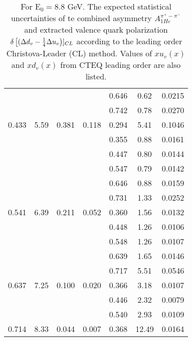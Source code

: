 \begin{table}[htbp]
\begin{center}
\begin{tabular}{|ccccc||c|c|}
         &          &          &          &    0.646 &      0.62 &    0.0215 \\
         &          &          &          &    0.742 &      0.78 &    0.0270 \\
   0.433 &    5.59 &   0.381 &    0.118 &    0.294 &      5.41 &    0.1046 \\
         &          &          &          &    0.355 &      0.88 &    0.0161 \\
         &          &          &          &    0.447 &      0.80 &    0.0144 \\
         &          &          &          &    0.547 &      0.79 &    0.0142 \\
         &          &          &          &    0.646 &      0.88 &    0.0159 \\
         &          &          &          &    0.731 &      1.33 &    0.0252 \\
   0.541 &    6.39 &   0.211 &    0.052 &    0.360 &      1.56 &    0.0132 \\
         &          &          &          &    0.448 &      1.26 &    0.0106 \\
         &          &          &          &    0.548 &      1.26 &    0.0107 \\
         &          &          &          &    0.639 &      1.65 &    0.0146 \\
         &          &          &          &    0.717 &      5.51 &    0.0546 \\
   0.637 &    7.25 &   0.100 &    0.020 &    0.366 &      3.18 &    0.0107 \\
         &          &          &          &    0.446 &      2.32 &    0.0079 \\
         &          &          &          &    0.540 &      2.93 &    0.0109 \\
   0.714 &    8.33 &   0.044 &    0.007 &    0.368 &     12.49 &    0.0164 \\
\hline
\end{tabular}
\end{center}
\caption{\label{tab:ddv2}  For E$_0=8.8 $ GeV. 
The expected statistical uncertainties of te combined asymmetry  $A_{1He}^{\pi^+ - \pi^-}$ and  extracted valence quark polarization $\delta \left[( \Delta d_v -{1 \over 4} \Delta u_v \right)]_{CL}$
according to the leading order Christova-Leader (CL) method. Values of $x u_v(x)$ and $x d_v(x)$ from CTEQ leading order are also listed.
}
\end{table}
